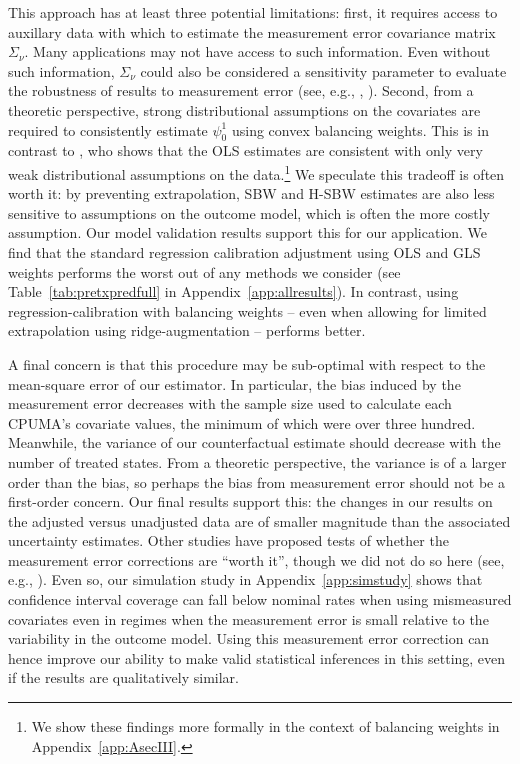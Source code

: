 \documentclass[aoas]{imsart}
\theoremstyle{plain}
\theoremstyle{remark}
\begin{document}
This approach has at least three potential limitations: first, it requires access to auxillary data with which to estimate the measurement error covariance matrix $\Sigma_{\nu}$. Many applications may not have access to such information. Even without such information, $\Sigma_{\nu}$ could also be considered a sensitivity parameter to evaluate the robustness of results to measurement error (see, e.g., \cite{huque2014impact}, \cite{illenberger2020impact}). Second, from a theoretic perspective, strong distributional assumptions on the covariates are required to consistently estimate $\psi_0^1$ using convex balancing weights. This is in contrast to \cite{gleser1992importance}, who shows that the OLS estimates are consistent with only very weak distributional assumptions on the data.\footnote{We show these findings more formally in the context of balancing weights in Appendix~\ref{app:AsecIII}.} We speculate this tradeoff is often worth it: by preventing extrapolation, SBW and H-SBW estimates are also less sensitive to assumptions on the outcome model, which is often the more costly assumption. Our model validation results support this for our application. We find that the standard regression calibration adjustment using OLS and GLS weights performs the worst out of any methods we consider (see Table~\ref{tab:pretxpredfull} in Appendix~\ref{app:allresults}). In contrast, using regression-calibration with balancing weights -- even when allowing for limited extrapolation using ridge-augmentation -- performs better.

A final concern is that this procedure may be sub-optimal with respect to the mean-square error of our estimator. In particular, the bias induced by the measurement error decreases with the sample size used to calculate each CPUMA's covariate values, the minimum of which were over three hundred. Meanwhile, the variance of our counterfactual estimate should decrease with the number of treated states. From a theoretic perspective, the variance is of a larger order than the bias, so perhaps the bias from measurement error should not be a first-order concern. Our final results support this: the changes in our results on the adjusted versus unadjusted data are of smaller magnitude than the associated uncertainty estimates. Other studies have proposed tests of whether the measurement error corrections are ``worth it'', though we did not do so here (see, e.g., \cite{gleser1992importance}). Even so, our simulation study in Appendix~\ref{app:simstudy} shows that confidence interval coverage can fall below nominal rates when using mismeasured covariates even in regimes when the measurement error is small relative to the variability in the outcome model. Using this measurement error correction can hence improve our ability to make valid statistical inferences in this setting, even if the results are qualitatively similar.
\end{document}
